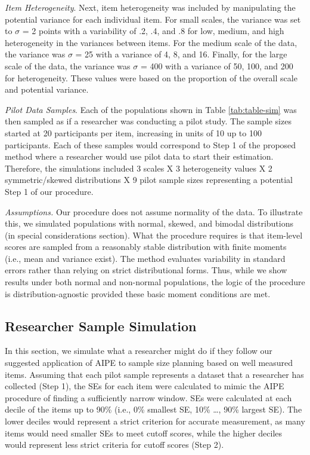 \documentclass[
  man]{apa7}
\begin{document}
\emph{Item Heterogeneity}. Next, item heterogeneity was included by manipulating the potential variance for each individual item. For small scales, the variance was set to \(\sigma\) = 2 points with a variability of .2, .4, and .8 for low, medium, and high heterogeneity in the variances between items. For the medium scale of the data, the variance was \(\sigma\) = 25 with a variance of 4, 8, and 16. Finally, for the large scale of the data, the variance was \(\sigma\) = 400 with a variance of 50, 100, and 200 for heterogeneity. These values were based on the proportion of the overall scale and potential variance.

\emph{Pilot Data Samples}. Each of the populations shown in Table \ref{tab:table-sim} was then sampled as if a researcher was conducting a pilot study. The sample sizes started at 20 participants per item, increasing in units of 10 up to 100 participants. Each of these samples would correspond to Step 1 of the proposed method where a researcher would use pilot data to start their estimation. Therefore, the simulations included 3 scales X 3 heterogeneity values X 2 symmetric/skewed distributions X 9 pilot sample sizes representing a potential Step 1 of our procedure.

\emph{Assumptions.} Our procedure does not assume normality of the data. To illustrate this, we simulated populations with normal, skewed, and bimodal distributions (in special considerations section). What the procedure requires is that item-level scores are sampled from a reasonably stable distribution with finite moments (i.e., mean and variance exist). The method evaluates variability in standard errors rather than relying on strict distributional forms. Thus, while we show results under both normal and non-normal populations, the logic of the procedure is distribution-agnostic provided these basic moment conditions are met.

\subsection{Researcher Sample Simulation}\label{researcher-sample-simulation}

In this section, we simulate what a researcher might do if they follow our suggested application of AIPE to sample size planning based on well measured items. Assuming that each pilot sample represents a dataset that a researcher has collected (Step 1), the SEs for each item were calculated to mimic the AIPE procedure of finding a sufficiently narrow window. SEs were calculated at each decile of the items up to 90\% (i.e., 0\% smallest SE, 10\% \ldots, 90\% largest SE). The lower deciles would represent a strict criterion for accurate measurement, as many items would need smaller SEs to meet cutoff scores, while the higher deciles would represent less strict criteria for cutoff scores (Step 2).
\end{document}
